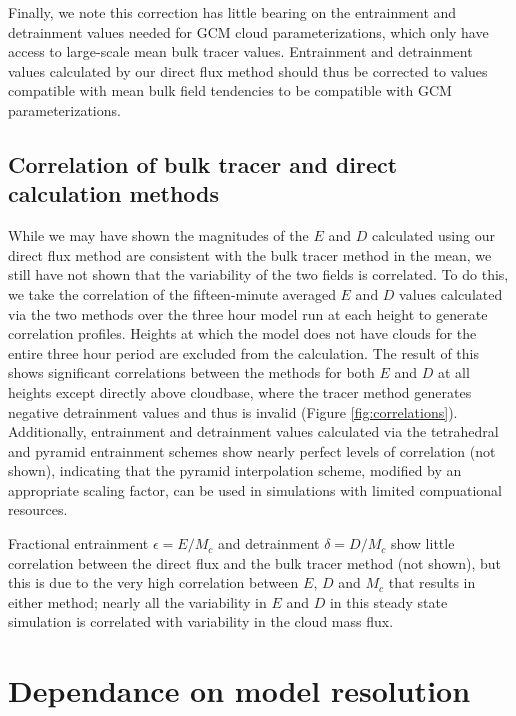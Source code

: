 \documentclass[12pt]{article}
\begin{document}
Finally, we note this correction has little bearing on the entrainment and 
detrainment values needed for GCM cloud parameterizations, which only have 
access to large-scale mean bulk tracer values.  Entrainment and detrainment 
values calculated by our direct flux method should thus be corrected to 
values compatible with mean bulk field tendencies to be compatible with GCM 
parameterizations.


\subsection{Correlation of bulk tracer and direct calculation methods}

While we may have shown the magnitudes of the $E$ and $D$ calculated using our
direct flux method are consistent with the bulk tracer method in the mean, we
still have not shown that the variability of the two fields is correlated.  To
do this, we take the correlation of the fifteen-minute averaged $E$ and $D$
values calculated via the two methods over the three hour model run at each
height to generate correlation profiles.  Heights at which the model does not
have clouds for the entire three hour period are excluded from the
calculation.  The result of this shows significant correlations between the
methods for both $E$ and $D$ at all heights except directly above cloudbase,
where the tracer method generates negative detrainment values and thus is
invalid (Figure \ref{fig:correlations}).  Additionally, entrainment and
detrainment values calculated via the tetrahedral and pyramid entrainment
schemes show nearly perfect levels of correlation (not shown), indicating that 
the pyramid interpolation scheme, modified by an appropriate scaling factor, 
can be used in simulations with limited compuational resources.

Fractional entrainment $\epsilon = E/M_c$ and detrainment $\delta = D/M_c$
show little correlation between the direct flux and the bulk tracer method 
(not shown), but this is due to the very high correlation between $E$, $D$ and
$M_c$ that results in either method; nearly all the variability in $E$ and $D$ 
in this steady state simulation is correlated with variability in the cloud 
mass flux.


\section{Dependance on model resolution}
\end{document}
